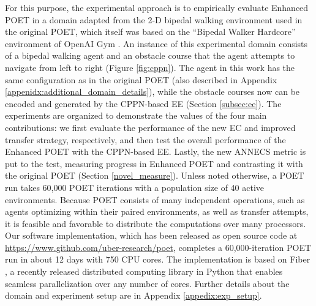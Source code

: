 \documentclass{article}
\newcommand{\ks}[1]{\comments{\textcolor{purple}{[Ken: #1]}}}
\newcommand{\rwang}[1]{\comments{\textcolor{blue}{[Rui: #1]}}}
\newcommand{\comments}[1]{#1} %
\begin{document}
For this purpose, the experimental approach is to empirically evaluate Enhanced POET in a
domain adapted from the 2-D bipedal walking environment used in the original POET, which itself was based on the ``Bipedal Walker Hardcore'' environment of OpenAI Gym \cite{brockman2016openai}.
An instance of this experimental domain consists of a bipedal walking agent and an obstacle course that the agent attempts to navigate from left to right (Figure \ref{fig:cppn}). The agent in this work has the same configuration as in the original POET 
(also described in Appendix \ref{appenidx:additional_domain_details}), while the obstacle courses now can be encoded and generated by the CPPN-based EE (Section \ref{subsec:ee}). The experiments are organized to demonstrate the values of the four main contributions: we first evaluate the performance of the new EC and improved transfer strategy, respectively, and then test the overall performance of the Enhanced POET with the CPPN-based EE. Lastly, the new ANNECS metric is put to the test, measuring progress in Enhanced POET and contrasting it with the original POET (Section \ref{novel_measure}). Unless noted otherwise, a POET run takes 60,000 POET iterations with a population size of 40 active environments. Because POET consists of many independent operations, such as agents optimizing within their paired environments, as well as transfer attempts, it is feasible and favorable to distribute the computations over many processors. Our software implementation, which has been released as open source code at \url{https://www.github.com/uber-research/poet}, completes a 60,000-iteration
POET run in about 12 days with 750 CPU cores. The implementation is based on Fiber \cite{zhi2020fiber}, a recently released distributed computing library in Python that enables seamless parallelization over any number of cores. Further details about the domain and experiment setup are in Appendix \ref{appedix:exp_setup}. 






\end{document}
